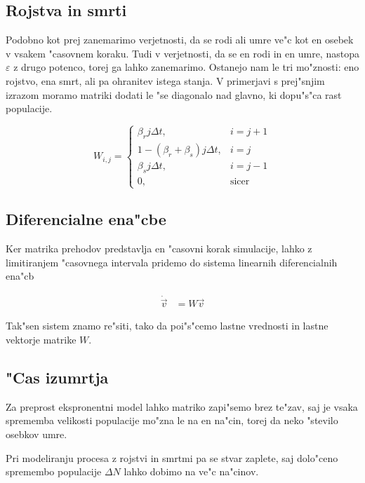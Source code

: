 \documentclass[a4paper,10pt]{article}
\newcommand{\eps}{\varepsilon}
\begin{document}
\subsection{Rojstva in smrti}

Podobno kot prej zanemarimo verjetnosti, da se rodi ali umre ve"c kot en osebek v vsakem "casovnem koraku. Tudi v verjetnosti, da se en rodi in en umre, nastopa $\eps$ z drugo potenco, torej ga lahko zanemarimo. Ostanejo nam le tri mo"znosti: eno rojstvo, ena smrt, ali pa ohranitev istega stanja. V primerjavi s prej"snjim izrazom moramo matriki dodati le "se diagonalo nad glavno, ki dopu"s"ca rast populacije. 

\begin{equation}
  W_{i,j} = \left\{ \begin{matrix} 
                      \beta_r j \Delta t, & i=j+1 \\
		      1 - (\beta_r+\beta_s) j \Delta t, & i=j \\
                      \beta_s j \Delta t, & i=j-1 \\
		      0, & \mathrm{sicer}
                    \end{matrix}\right.
\end{equation}

\subsection{Diferencialne ena"cbe}

Ker matrika prehodov predstavlja en "casovni korak simulacije, lahko z limitiranjem "casovnega intervala pridemo do sistema linearnih diferencialnih ena"cb

\begin{align}
  \dot {\vec v} &= W \vec v
\end{align}

Tak"sen sistem znamo re"siti, tako da poi"s"cemo lastne vrednosti in lastne vektorje matrike $W$. 

\subsection{"Cas izumrtja}

Za preprost ekspronentni model lahko matriko zapi"semo brez te"zav, saj je vsaka sprememba velikosti populacije mo"zna le na en na"cin, torej da neko "stevilo osebkov umre. 

Pri modeliranju procesa z rojstvi in smrtmi pa se stvar zaplete, saj dolo"ceno spremembo populacije $\Delta N$ lahko dobimo na ve"c na"cinov. 
\end{document}
